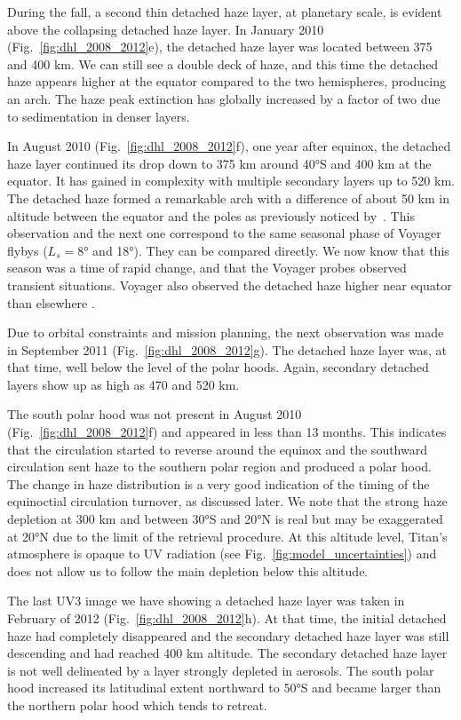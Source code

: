 During the fall, a second thin detached haze layer, at planetary scale, is evident above the collapsing detached
haze layer. In January 2010 (Fig.~\ref{fig:dhl_2008_2012}e), the detached haze layer was located between 375 and 400 km.
We can still see a double deck of haze, and this time the detached haze appears higher at the equator compared to the two
hemispheres, producing an arch. The haze peak extinction has globally increased by a factor of two due to sedimentation
in denser layers.

In August 2010 (Fig.~\ref{fig:dhl_2008_2012}f), one year after equinox, the detached haze layer continued
its drop down to 375 km around \ang{40}S and 400 km at the equator. It has gained in complexity with
multiple secondary layers up to 520 km. The detached haze formed a remarkable arch with a difference of about 50 km
in altitude between the equator and the poles as previously noticed by~\cite{West2011}.
This observation and the next one correspond to the same seasonal phase  of Voyager flybys ($L_s=\ang{8}$ and \ang{18}).
They can be compared directly.
We now know that this season was a time of rapid change, and that the Voyager probes observed transient situations.
Voyager also observed the detached haze higher near equator than elsewhere \citep{Rages1983, Rannou2000}.

Due to orbital constraints and mission planning, the next observation was made in September 2011
(Fig.~\ref{fig:dhl_2008_2012}g). The detached haze layer was, at that time, well below the level of the polar hoods.
Again, secondary detached layers show up as high as 470 and 520 km.

The south polar hood was not present in August 2010 (Fig.~\ref{fig:dhl_2008_2012}f) and appeared in less than 13 months.
This indicates that the circulation started to reverse around the equinox and the southward circulation sent haze to
the southern polar region and produced a polar hood. The change in haze distribution
is a very good indication of the timing of the equinoctial circulation turnover, as  discussed later. We note
that the strong haze depletion at 300 km and between \ang{30}S and \ang{20}N is real  but may be exaggerated at \ang{20}N
due to the limit of the retrieval procedure. At this altitude level, Titan's atmosphere is opaque to UV radiation
(see Fig.~\ref{fig:model_uncertainties}) and does not allow us to follow the main depletion below this altitude.

The last UV3 image we have showing a detached haze layer was taken in February of 2012 (Fig.~\ref{fig:dhl_2008_2012}h). At that
time, the initial detached haze had completely disappeared and the secondary detached haze layer was still descending
and had reached 400 km altitude. The secondary detached haze layer is not well delineated by a layer strongly depleted in aerosols.
The south polar hood increased its latitudinal extent northward to \ang{50}S and became larger than the northern
polar hood which tends to retreat.
